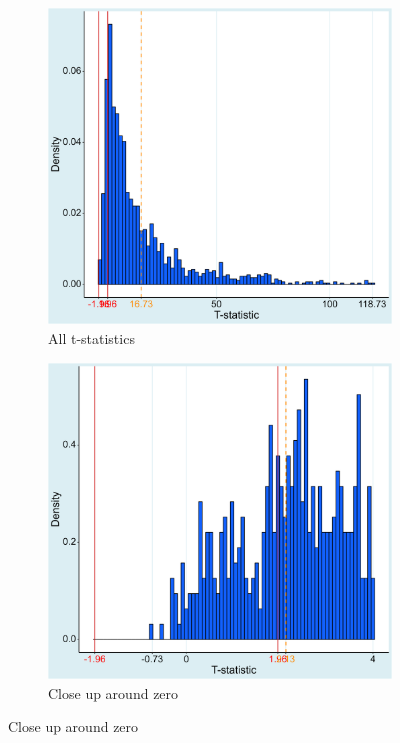 \begin{figure}[!b]
  \centering
  \caption{The distribution of t-statistics is heavily skewed}
  \label{fig:t_hist}
  \begin{subfigure}[b]{0.45\textwidth}
    \caption{All t-statistics}
    \includegraphics[width=0.95\linewidth]{Figures/t_hist.png}
  \end{subfigure}
  \begin{subfigure}[b]{0.45\textwidth}
    \caption{Close up around zero}
    \includegraphics[width=0.95\linewidth]{Figures/t_hist_closeup.png}

\end{subfigure}
\end{figure}
